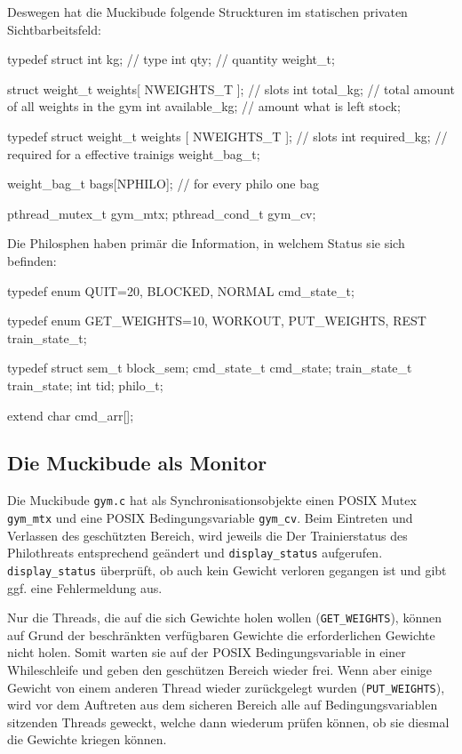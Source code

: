 \documentclass[
   draft=false
  ,paper=a4
  ,twoside=false
  ,fontsize=11pt
  ,headsepline
  ,BCOR10mm
  ,DIV11
  ,parskip=full+
]{scrartcl} %
\begin{document}
Deswegen hat die Muckibude folgende Struckturen im statischen privaten
Sichtbarbeitsfeld:
\begin{ccode}
  typedef struct {
      int kg;        // type
      int qty;       // quantity
  } weight_t;

  struct{
      weight_t weights[ NWEIGHTS_T ]; // slots
      int total_kg;                   // total amount of all weights in the gym
      int available_kg;               // amount what is left
  } stock;

  typedef struct {
      weight_t weights [ NWEIGHTS_T ];   // slots
      int required_kg;                   // required for a effective trainigs
  } weight_bag_t;

  weight_bag_t bags[NPHILO];             // for every philo one bag

  pthread_mutex_t gym_mtx;
  pthread_cond_t gym_cv;
\end{ccode}

Die Philosphen haben primär die Information, in welchem Status sie sich
befinden:
\begin{ccode}
typedef enum {
    QUIT=20,
    BLOCKED,
    NORMAL
} cmd_state_t;

typedef enum {
    GET_WEIGHTS=10,
    WORKOUT,
    PUT_WEIGHTS,
    REST
} train_state_t;

typedef struct {
    sem_t block_sem;
    cmd_state_t cmd_state;
    train_state_t train_state;
    int tid;
} philo_t;

extend char cmd_arr[];
\end{ccode}

\subsection{Die Muckibude als Monitor}
  Die Muckibude \texttt{gym.c} hat als Synchronisationsobjekte einen POSIX
  Mutex \texttt{gym\_mtx} und eine POSIX Bedingungsvariable \texttt{gym\_cv}.
  Beim Eintreten und Verlassen des geschützten Bereich, wird jeweils die
  Der Trainierstatus des Philothreats entsprechend geändert und
  \texttt{display\_status} aufgerufen. \texttt{display\_status} überprüft,
  ob auch kein Gewicht verloren gegangen ist und gibt ggf. eine Fehlermeldung
  aus.

  Nur die Threads, die auf die sich Gewichte holen wollen
  (\texttt{GET\_WEIGHTS}), können auf Grund der beschränkten verfügbaren Gewichte die
  erforderlichen Gewichte nicht holen. Somit warten
  sie auf der POSIX Bedingungsvariable in einer Whileschleife und geben den
  geschützen Bereich wieder frei. Wenn aber einige Gewicht von einem anderen
  Thread wieder zurückgelegt wurden (\texttt{PUT\_WEIGHTS}), wird vor dem
  Auftreten aus dem sicheren Bereich alle auf Bedingungsvariablen sitzenden
  Threads geweckt, welche dann wiederum prüfen können, ob sie diesmal die
  Gewichte kriegen können.
\end{document}
